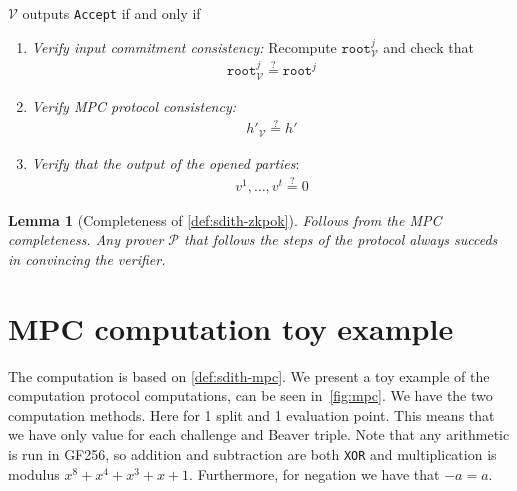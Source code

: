 \documentclass[11pt]{report}
\theoremstyle{definition}
\theoremstyle{plain}
\newtheorem{lemma}{Lemma}[section]
\begin{document}
\begin{protocol}
  $\mathcal{V}$ outputs \texttt{Accept} if and only if

  \begin{enumerate}[parsep=0pt, itemsep=0pt, topsep=0pt]
    \item \textit{Verify input commitment consistency:} Recompute $\texttt{root}^j_{\mathcal{V}}$ and check that
          \begin{align*}
            \texttt{root}^j_{\mathcal{V}} \stackrel{?}{=} \texttt{root}^j
          \end{align*}
    \item \textit{Verify MPC protocol consistency:}
          \begin{align*}
            h'_{\mathcal{V}} \stackrel{?}{=} h'
          \end{align*}
    \item \textit{Verify that the output of the opened parties}:
          \begin{align*}
            v^1, \dots, v^t \stackrel{?}{=} 0
          \end{align*}
  \end{enumerate}
\end{protocol}

\begin{lemma}[Completeness of \autoref{def:sdith-zkpok}]
  Follows from the MPC completeness. Any prover $\mathcal{P}$ that follows the steps of the protocol always succeds in convincing the verifier.
\end{lemma}

\section{MPC computation toy example}\label{app:toy_example}

The computation is based on \autoref{def:sdith-mpc}. We present a toy example of the computation protocol computations, can be seen in~\autoref{fig:mpc}. We have the two computation methods. Here for 1 split and 1 evaluation point. This means that we have only value for each challenge and Beaver triple. Note that any arithmetic is run in GF256, so addition and subtraction are both \texttt{XOR} and multiplication is modulus $x^8 + x^4 + x^3 + x + 1$. Furthermore, for negation we have that $-a = a$.
\end{document}
